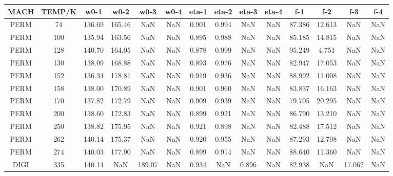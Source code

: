 \begin{table}[h]
	\scriptsize
	\begin{tabular}{cccccccccccccc}
		\hline
		MACH & TEMP/K & w0-1   & w0-2   & w0-3   & w0-4   & eta-1 & eta-2 & eta-3 & eta-4 & f-1    & f-2    & f-3     & f-4     \\ \hline
		\rowcolor[HTML]{EFEFEF} 
		PERM & 74     & 136.69 & 165.46 & NaN    & NaN    & 0.901 & 0.994 & NaN   & NaN   & 87.386 & 12.613 & NaN     & NaN     \\
		PERM & 100    & 135.94 & 163.56 & NaN    & NaN    & 0.895 & 0.988 & NaN   & NaN   & 85.185 & 14.815 & NaN     & NaN     \\
		\rowcolor[HTML]{EFEFEF} 
		PERM & 128    & 140.70 & 164.05 & NaN    & NaN    & 0.878 & 0.999 & NaN   & NaN   & 95.249 & 4.751  & NaN     & NaN     \\
		PERM & 130    & 138.09 & 168.88 & NaN    & NaN    & 0.893 & 0.976 & NaN   & NaN   & 82.947 & 17.053 & NaN     & NaN     \\
		\rowcolor[HTML]{EFEFEF} 
		PERM & 152    & 136.34 & 178.81 & NaN    & NaN    & 0.919 & 0.936 & NaN   & NaN   & 88.992 & 11.008 & NaN     & NaN     \\
		PERM & 158    & 138.00 & 170.89 & NaN    & NaN    & 0.901 & 0.960 & NaN   & NaN   & 83.837 & 16.163 & NaN     & NaN     \\
		\rowcolor[HTML]{EFEFEF} 
		PERM & 170    & 137.82 & 172.79 & NaN    & NaN    & 0.909 & 0.939 & NaN   & NaN   & 79.705 & 20.295 & NaN     & NaN     \\
		PERM & 200    & 138.60 & 172.83 & NaN    & NaN    & 0.899 & 0.921 & NaN   & NaN   & 86.790 & 13.210 & NaN     & NaN     \\
		\rowcolor[HTML]{EFEFEF} 
		PERM & 250    & 138.82 & 175.95 & NaN    & NaN    & 0.921 & 0.898 & NaN   & NaN   & 82.488 & 17.512 & NaN     & NaN     \\
		PERM & 262    & 140.14 & 175.37 & NaN    & NaN    & 0.920 & 0.955 & NaN   & NaN   & 87.293 & 12.708 & NaN     & NaN     \\
		\rowcolor[HTML]{EFEFEF} 
		PERM & 274    & 140.03 & 177.90 & NaN    & NaN    & 0.899 & 0.914 & NaN   & NaN   & 88.640 & 11.360 & NaN     & NaN     \\
		DIGI & 335    & 140.14 & NaN    & 189.07 & NaN    & 0.934 & NaN   & 0.896 & NaN   & 82.938 & NaN    & 17.062  & NaN     \\

\end{tabular}
\end{table}
